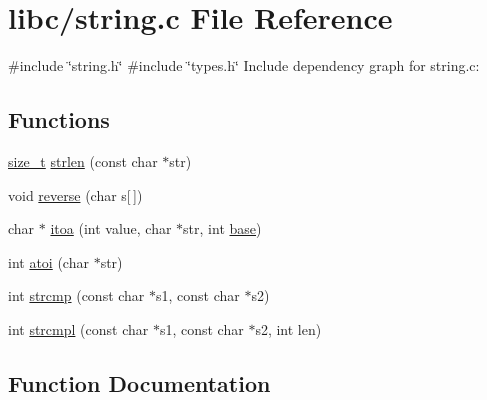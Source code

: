 \hypertarget{a00125}{}\section{libc/string.c File Reference}
\label{a00125}
{\ttfamily \#include \char`\"{}string.\+h\char`\"{}}\newline
{\ttfamily \#include \char`\"{}types.\+h\char`\"{}}\newline
Include dependency graph for string.\+c\+:
\subsection*{Functions}
\begin{DoxyCompactItemize}
\item 
\hyperlink{a00140_a29d85914ddff32967d85ada69854206d_a29d85914ddff32967d85ada69854206d}{size\+\_\+t} \hyperlink{a00125_a008e171a518fe0e0352f31b245e03875_a008e171a518fe0e0352f31b245e03875}{strlen} (const char $\ast$str)
\item 
void \hyperlink{a00125_aa8a9a8836962d890b4939c112fd29190_aa8a9a8836962d890b4939c112fd29190}{reverse} (char s\mbox{[}$\,$\mbox{]})
\item 
char $\ast$ \hyperlink{a00125_ab42640268f26e065efd044cfe80591bd_ab42640268f26e065efd044cfe80591bd}{itoa} (int value, char $\ast$str, int \hyperlink{a00110_a0523cedff47e2441fc198b7770ec5d3f_a0523cedff47e2441fc198b7770ec5d3f}{base})
\item 
int \hyperlink{a00125_a8456d79947fb428e0927d19e7a1e9423_a8456d79947fb428e0927d19e7a1e9423}{atoi} (char $\ast$str)
\item 
int \hyperlink{a00125_a11bd144d7d44914099a3aeddf1c8567d_a11bd144d7d44914099a3aeddf1c8567d}{strcmp} (const char $\ast$s1, const char $\ast$s2)
\item 
int \hyperlink{a00125_a3c8c44ba2ae232bc5ae8449de1448164_a3c8c44ba2ae232bc5ae8449de1448164}{strcmpl} (const char $\ast$s1, const char $\ast$s2, int len)
\end{DoxyCompactItemize}


\subsection{Function Documentation}
\mbox{\label{a00125_a8456d79947fb428e0927d19e7a1e9423_a8456d79947fb428e0927d19e7a1e9423}} 
